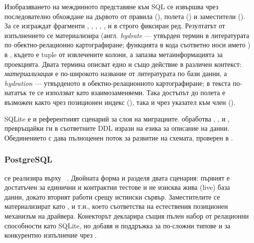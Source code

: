 Изобразяването на междинното представяне към SQL се извършва чрез последователно обхождане на дървото от правила (), полета () и заместители (). За  се изграждат фрагменти , , , , ,  и  в строго фиксиран ред. Резултатът от изпълнението се материализира (англ. \emph{hydrate} --- утвърден термин в литературата по обектно-релационно картографиране; функцията в кода съответно носи името ) в , където  е tuple от извлечените колони, а  запазва метаинформацията за проекцията. Двата термина описват едно и също действие в различен контекст: \emph{материализация} е по-широкото название от литературата по бази данни, а \emph{hydration} --- утвърденото в обектно-релационното картографиране; в текста по-нататък те се използват като взаимозаменяеми. Така достъпът до полета е възможен както чрез позиционен индекс (), така и чрез указател към член ().

SQLite е и референтният сценарий за слоя на миграциите.  обработва , ,  и , превръщайки ги в съответните DDL изрази на езика за описание на данни. Обединението с  дава пълноценен поток за развитие на схемата, проверен в .

\subsubsection{PostgreSQL}

 се реализира върху ~\cite{libpq}. Двойната форма  и  разделя двата сценария: първият е достатъчен за единични и контрактни тестове и не изисква жива (live) база данни, докато вторият работи срещу истински сървър. Заместителите се материализират като ,  и т.н., което съответства на естествения позиционен механизъм на драйвера. Конекторът декларира същия пълен набор от релационни способности като SQLite, но добавя и поддръжка за по-сложни типове и за конкурентно изпълнение чрез .

